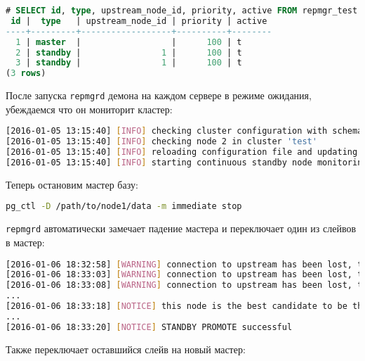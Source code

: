 \begin{lstlisting}[language=SQL,label=lst:repmgr3,caption=repl\_nodes]
# SELECT id, type, upstream_node_id, priority, active FROM repmgr_test.repl_nodes ORDER BY id;
 id |  type   | upstream_node_id | priority | active
----+---------+------------------+----------+--------
  1 | master  |                  |      100 | t
  2 | standby |                1 |      100 | t
  3 | standby |                1 |      100 | t
(3 rows)
\end{lstlisting}

После запуска \lstinline!repmgrd! демона на каждом сервере в режиме ожидания, убеждаемся что он мониторит кластер:

\begin{lstlisting}[language=Bash,label=lst:repmgr4,caption=logs]
[2016-01-05 13:15:40] [INFO] checking cluster configuration with schema 'repmgr_test'
[2016-01-05 13:15:40] [INFO] checking node 2 in cluster 'test'
[2016-01-05 13:15:40] [INFO] reloading configuration file and updating repmgr tables
[2016-01-05 13:15:40] [INFO] starting continuous standby node monitoring
\end{lstlisting}

Теперь остановим мастер базу:

\begin{lstlisting}[language=Bash,label=lst:repmgr5,caption=Остановка текущего мастера]
pg_ctl -D /path/to/node1/data -m immediate stop
\end{lstlisting}

\lstinline!repmgrd! автоматически замечает падение мастера и переключает один из слейвов в мастер:

\begin{lstlisting}[language=Bash,label=lst:repmgr6,caption=Переключение слейва в мастер]
[2016-01-06 18:32:58] [WARNING] connection to upstream has been lost, trying to recover... 15 seconds before failover decision
[2016-01-06 18:33:03] [WARNING] connection to upstream has been lost, trying to recover... 10 seconds before failover decision
[2016-01-06 18:33:08] [WARNING] connection to upstream has been lost, trying to recover... 5 seconds before failover decision
...
[2016-01-06 18:33:18] [NOTICE] this node is the best candidate to be the new master, promoting...
...
[2016-01-06 18:33:20] [NOTICE] STANDBY PROMOTE successful
\end{lstlisting}

Также переключает оставшийся слейв на новый мастер:

